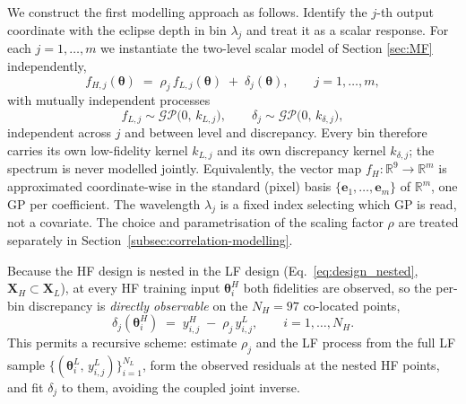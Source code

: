 \documentclass[11pt,a4paper]{article}
\begin{document}
We construct the first modelling approach as follows. Identify the $j$-th output coordinate with the eclipse depth in bin $\lambda_j$ and
treat it as a scalar response. For each $j=1,\dots,m$ we instantiate the
two-level scalar model of Section \ref{sec:MF} independently,
\begin{equation}
  f_{H,j}(\boldsymbol\theta)
    \;=\; \rho_j\, f_{L,j}(\boldsymbol\theta) \;+\; \delta_j(\boldsymbol\theta),
  \qquad j = 1,\dots,m,
\end{equation}
with mutually independent processes
\begin{equation}
  f_{L,j}\sim\mathcal{GP}\!\bigl(0,\,k_{L,j}\bigr),
  \qquad
  \delta_{j}\sim\mathcal{GP}\!\bigl(0,\,k_{\delta,j}\bigr),
\end{equation}
independent across $j$ and between level and discrepancy. Every bin therefore
carries its own low-fidelity kernel
$k_{L,j}$ and its own discrepancy kernel $k_{\delta,j}$; the spectrum is never
modelled jointly. Equivalently, the vector map $f_H:\mathbb{R}^{9}\to\mathbb{R}^{m}$
is approximated coordinate-wise in the standard (pixel) basis
$\{\mathbf{e}_1,\dots,\mathbf{e}_m\}$ of $\mathbb{R}^{m}$, one GP per coefficient.
The wavelength $\lambda_j$ is a fixed index selecting which GP is read, not a covariate.
The choice and parametrisation of the scaling factor $\rho$ are treated separately in Section~\ref{subsec:correlation-modelling}.

Because the HF design is nested in the LF design (Eq.~\ref{eq:design_nested},
$\bm{X}_{H}\subset\bm{X}_{L}$), at every HF training input $\boldsymbol\theta_i^{H}$ both
fidelities are observed, so the per-bin discrepancy is \emph{directly observable}
on the $N_{H}=97$ co-located points,
\begin{equation}
  \delta_j(\boldsymbol\theta_i^{H})
    \;=\; y^{H}_{i,j} \;-\; \rho_j\, y^{L}_{i,j},
  \qquad i = 1,\dots,N_{H} .
\end{equation}
This permits a recursive scheme: estimate $\rho_j$ and the LF
process from the full LF sample $\{(\boldsymbol\theta_i^{L},\,y^{L}_{i,j})\}_{i=1}^{N_{L}}$,
form the observed residuals at the nested HF points, and fit $\delta_j$ to them,
avoiding the coupled joint inverse.
\end{document}

